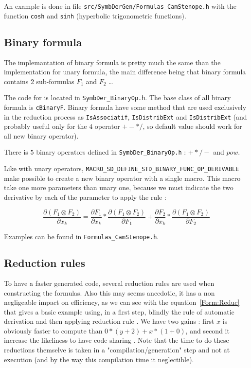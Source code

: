 An example is done in file {\tt src/SymbDerGen/Formulas\_CamStenope.h} with the function
{\tt cosh} and {\tt sinh}  (hyperbolic trigonometric functions).


\subsection{Binary formula}

The implemantation of binary formula is pretty much the same than the implementation for unary formula,
the main difference being that binary formula contains 2 sub-formulas $F_1$ and $F_2$ \dots

The code for is located in {\tt SymbDer\_BinaryOp.h}.  The base class of all binary formula is
{\tt cBinaryF}.  Binary formula have some method that are used exclusively in the reduction process 
as {\tt IsAssociatif},  {\tt IsDistribExt} and {\tt IsDistribExt}  (and probably useful only
for the $4$ operator $+-*/$, so default value should work for all new binary operator).

There is $5$ binary operators defined in  {\tt SymbDer\_BinaryOp.h} : $+*/-$ and $pow$.

Like with unary operators, {\tt MACRO\_SD\_DEFINE\_STD\_BINARY\_FUNC\_OP\_DERIVABLE}
make possible to create a new binary operator with a single macro.
This macro take one more parameters than unary one, because  we must indicate the two
derivative by each of the parameter to apply the rule :

\begin{equation}
        \frac{\partial (F_1 \otimes F_2)} {\partial x_k} 
     =   \frac{\partial F_1 } {\partial x_k} * \frac{\partial (F_1 \otimes F_2)} {\partial F_1} 
       + \frac{\partial F_2 } {\partial x_k} * \frac{\partial (F_1 \otimes F_2)} {\partial F_2} 
\end{equation}

Examples can be found in {\tt Formulas\_CamStenope.h}.



\subsection{Reduction rules}

\label{Reduc:Rule}

To have a faster generated code, several reduction rules are used when 
constructing the formulas. Also this may seems anecdotic,
it has a non negligeable  impact on efficiency, as we can see with the equation~\ref{Form:Reduc}
that gives a basic example using, in a first step, blindly the 
rule of automatic derivation and then applying reduction rule .
We have two gains : first $x$ is obviously faster to compute than $0 * (y+2) + x * (1 + 0)$,
and second it increase the likeliness to have code sharing . Note that the time to do
these reductions themselve is taken in a "compilation/generation" step and not at execution
(and by the way this compilation time it neglectible).

